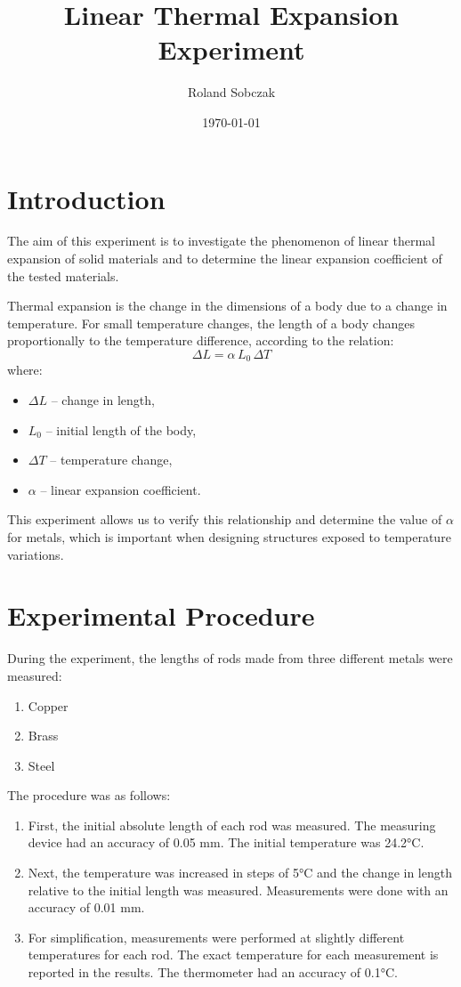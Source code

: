 \documentclass[a4paper,12pt]{article}
\title{Linear Thermal Expansion Experiment}
\author{Roland Sobczak}
\date{\today}
\begin{document}
\maketitle

\section{Introduction}

The aim of this experiment is to investigate the phenomenon of linear thermal expansion of solid materials and to determine the linear expansion coefficient of the tested materials.

Thermal expansion is the change in the dimensions of a body due to a change in temperature. For small temperature changes, the length of a body changes proportionally to the temperature difference, according to the relation:
\begin{equation}
    \Delta L = \alpha \, L_0 \, \Delta T
\end{equation}
where:
\begin{itemize}
    \item $\Delta L$ – change in length,
    \item $L_0$ – initial length of the body,
    \item $\Delta T$ – temperature change,
    \item $\alpha$ – linear expansion coefficient.
\end{itemize}

This experiment allows us to verify this relationship and determine the value of $\alpha$ for metals, which is important when designing structures exposed to temperature variations.

\section{Experimental Procedure}

During the experiment, the lengths of rods made from three different metals were measured:
\begin{enumerate}
    \item Copper
    \item Brass
    \item Steel
\end{enumerate}

The procedure was as follows:

\begin{enumerate}
    \item First, the initial absolute length of each rod was measured. The measuring device had an accuracy of 0.05 mm. The initial temperature was 24.2°C.
    \item Next, the temperature was increased in steps of 5°C and the change in length relative to the initial length was measured. Measurements were done with an accuracy of 0.01 mm.
    \item For simplification, measurements were performed at slightly different temperatures for each rod. The exact temperature for each measurement is reported in the results. The thermometer had an accuracy of 0.1°C.
\end{enumerate}
\end{document}
